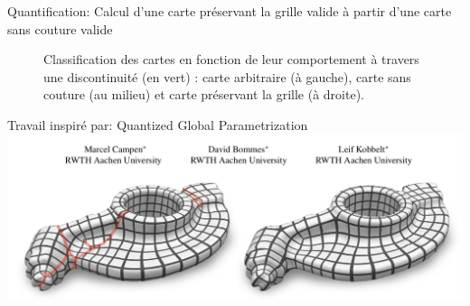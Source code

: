 \begin{frame}{Quantification: Calcul d'une carte préservant la grille valide à partir d'une carte sans couture valide}
\begin{figure}
        \caption{Classification des cartes en fonction de leur comportement à travers une discontinuité (en vert) : carte arbitraire (à gauche), carte sans couture (au milieu) et carte préservant la grille (à droite).}
        \label{fig:all_diff_maps}
    \end{figure}
\end{frame}

\begin{frame}{Travail inspiré par: Quantized Global Parametrization}
    \centering
    \includegraphics[width=\linewidth]{yoimg/qgp.png}
\end{frame}

